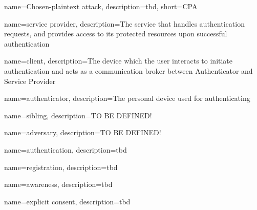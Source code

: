 

{
    name={Chosen-plaintext attack},
    description={tbd},
    short={CPA}
}

{
    name={service provider},
    description={The service that handles authentication requests, and provides access to its protected resources upon successful authentication}
}

{
    name={client},
    description={The device which the user interacts to initiate authentication and acts as a communication broker between Authenticator and Service Provider}
}

{
    name={authenticator},
    description={The personal device used for authenticating}
}

{
    name={sibling},
    description={TO BE DEFINED!}
}

{
    name={adversary},
    description={TO BE DEFINED!}
}

{
    name={authentication},
    description={tbd}
}


{
    name={registration},
    description={tbd}
}

{
    name={awareness},
    description={tbd}
}

{
    name={explicit consent},
    description={tbd}
}